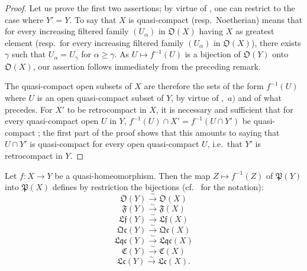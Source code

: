 \begin{proof}
Let us prove the first two assertions; by virtue of , one can restrict to the case where $Y'=Y$.
To say that $X$ is quasi-compact (resp.\ Noetherian) means that for every increasing filtered family $(U_\alpha)$ in $\mathfrak{O}(X)$ having $X$ as greatest element (resp.\ for every increasing filtered family $(U_\alpha)$ in $\mathfrak{O}(X)$), there exists $\gamma$ such that $U_\alpha=U_\gamma$ for $\alpha\geq\gamma$.
As $U\mapsto f^{-1}(U)$ is a bijection of $\mathfrak{O}(Y)$ onto $\mathfrak{O}(X)$, our assertion follows immediately from the preceding remark.

The quasi-compact open subsets of $X$ are therefore the sets of the form $f^{-1}(U)$ where $U$ is an open quasi-compact subset of $Y$, by virtue of ,~$a)$ and of what precedes.
For $X'$ to be retrocompact in $X$, it is necessary and sufficient that for every quasi-compact open $U$ in $Y$, $f^{-1}(U)\cap X'=f^{-1}(U\cap Y')$ be quasi-compact ; the first part of the proof shows that this amounts to saying that $U\cap Y'$ is quasi-compact for every open quasi-compact $U$, i.e.\ that $Y'$ is retrocompact in $Y$.
\end{proof}

\begin{proposition}[10.2.7]
\label{IV.10.2.7}
Let $f:X\to Y$ be a quasi-homeomorphism.
Then the map $Z\mapsto f^{-1}(Z)$ of $\mathfrak{P}(Y)$ into $\mathfrak{P}(X)$ defines by restriction the bijections (cf.\  for the notation):
\[
  \mathfrak{O}(Y)\xrightarrow{\sim}\mathfrak{O}(X)
\]
\[
  \mathfrak{F}(Y)\xrightarrow{\sim}\mathfrak{F}(X)
\]
\[
  \mathfrak{Lf}(Y)\xrightarrow{\sim}\mathfrak{Lf}(X)
\]
\[
  \mathfrak{Qc}(Y)\xrightarrow{\sim}\mathfrak{Qc}(X)
\]
\[
  \mathfrak{Lqc}(Y)\xrightarrow{\sim}\mathfrak{Lqc}(X)
\]
\[
  \mathfrak{C}(Y)\xrightarrow{\sim}\mathfrak{C}(X)
\]
\[
  \mathfrak{Lc}(Y)\xrightarrow{\sim}\mathfrak{Lc}(X).
\]
\end{proposition}

